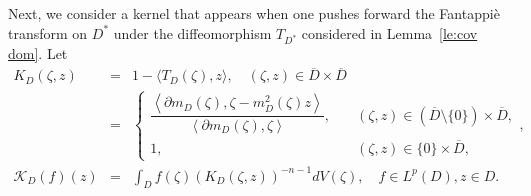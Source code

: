 \documentclass[11pt, oneside, reqno]{amsart}
\numberwithin{equation}{section}
\theoremstyle{definition}
\newcommand{\bea} {\begin{eqnarray}}
\newcommand{\eea} {\end{eqnarray}}
\newcommand{\ltt}{\left(}
\newcommand{\rtt}{\right)}
\begin{document}
{%
Next, we consider a kernel that appears when one pushes forward the Fantappi{\`e} transform on $D^*$ under the diffeomorphism $T_{D^*}$ considered in Lemma~\ref{le:cov dom}. Let
\bea
    K_{D}\ltt\zeta,z\rtt&=& 
        1-\langle T_D(\zeta),z\rangle,\quad (\zeta,z)\in\overline D\times\overline D 
            \label{eq:def of FLD kera}\\
        &=&
        \begin{cases}        \dfrac{\left\langle \partial m_{D}(\zeta),\zeta-m_{D}^2(\zeta)z\right\rangle}{\left\langle \partial m_{D}(\zeta),\zeta\right\rangle},&\quad\ltt\zeta,z\rtt\in\ltt\overline D\setminus\{0\}\rtt\times\overline D,\\
    1,&\quad \ltt\zeta,z\rtt\in\{0\}\times\overline D,         \end{cases} \label{eq:def of FLS ker},\\
    \mathcal K_D(f)(z)&=&\int_{D} f(\zeta) \left(K_D\ltt\zeta,z\rtt\right)^{-n-1} dV(\zeta),\quad f\in L^p(D), z\in D.
    \label{eq:def of FLS SIO}
\eea

}
\end{document}
